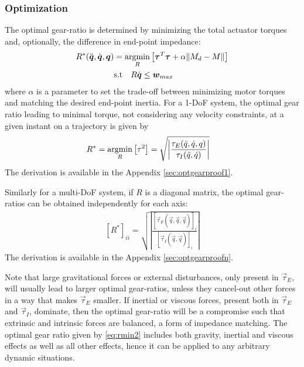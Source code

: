\subsubsection{Optimization}
 The optimal gear-ratio is determined by minimizing the total actuator torques and, optionally, the difference in end-point impedance:
%
\begin{align}
	R^{*}(\ddot{\vec{q}},\dot{\vec{q}},\vec{q}) &= \operatornamewithlimits{argmin}\limits_{R} \left[ \vec{\tau}^T \vec{\tau} + \alpha \| M_{d} - M \| \right]  \\
	& \text{s.t}  \quad R \dot{\vec{q}} \leq \vec{w}_{max} 
\label{eq:rmin_general}
\end{align}
%
where $\alpha$ is a parameter to set the trade-off between minimizing motor torques and matching the desired end-point inertia.
%
For a 1-DoF system, the optimal gear ratio leading to minimal torque, not considering any velocity constraints, at a given instant on a trajectory is given by
%
\begin{align}
	R^{*} &= \operatornamewithlimits{argmin}\limits_{R} \left[ \tau^2 \right] = \sqrt{ \left | \frac{\tau_{E}(\ddot{q},\dot{q},q)}{\tau_{I}(\ddot{q},\dot{q})} \right |   } 
\label{eq:aaa}
\end{align}
%
The derivation is available in the Appendix \ref{sec:optgearproof1}.

Similarly for a multi-DoF system, if $R$ is a diagonal matrix, the optimal gear-ratios can be obtained independently for each axis:
%
\begin{align}
	[R^*]_{ii} = \sqrt{ \left | \frac{ [\vec{\tau}_{E}(\ddot{\vec{q}},\dot{\vec{q}},\vec{q})]_i }{ [\vec{\tau}_{I}(\ddot{\vec{q}},\dot{\vec{q}})]_i } \right | }
 \label{eq:rmin2}
\end{align}
%
The derivation is available in the Appendix \ref{sec:optgearproofn}.

Note that large gravitational forces or external disturbances, only present in $\vec{\tau}_{E}$, will usually lead to larger optimal gear-ratios, unless they cancel-out other forces in a way that makes $\vec{\tau}_{E}$ smaller. If inertial or viscous forces, present both in $\vec{\tau}_{E}$ and $\vec{\tau}_{I}$, dominate, then the optimal gear-ratio will be a compromise such that extrinsic and intrinsic forces are balanced, a form of impedance matching. The optimal gear ratio given by \eqref{eq:rmin2} includes both gravity, inertial and viscous effects as well as all other effects, hence it can be applied to any arbitrary dynamic situations.

